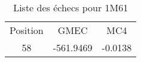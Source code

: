     \begin{table}[h]
      \centering

      \begin{tabular}{ccc}

        \toprule
        Position & GMEC & MC4 \\
        \cmidrule{1-3}
        58 & -561.9469 & -0.0138 \\
       \bottomrule        
      \end{tabular}      
      \caption{Liste des échecs pour 1M61}
\label{tab:result_1_active_1M61}      
    \end{table}
    

    \begin{table}[h]
      \centering
      
      \begin{tabular}{ccc}
        

\end{tabular}
\end{table}
